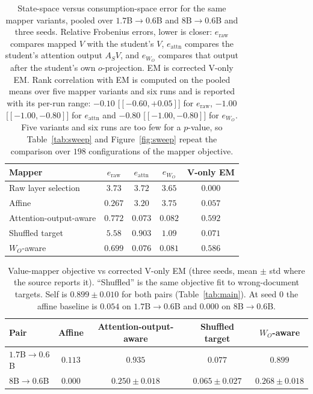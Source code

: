 \documentclass[11pt]{article}
\begin{document}
\begin{table}[t]
\centering
\small
\caption{State-space versus consumption-space error for the same mapper variants,
pooled over $1.7$B$\to0.6$B and $8$B$\to0.6$B and three seeds. Relative
Frobenius errors, lower is closer: $e_{\text{raw}}$ compares mapped $V$ with the
student's $V$, $e_{\text{attn}}$ compares the student's attention output
$A_S V$, and $e_{W_O}$ compares that output after the student's own $o$-projection.
EM is corrected V-only EM. Rank correlation with EM is computed on the pooled
means over five mapper variants and six runs and is reported with its per-run
range: $-0.10$ [$[-0.60,+0.05]$] for $e_{\text{raw}}$, $-1.00$
[$[-1.00,-0.80]$] for $e_{\text{attn}}$ and $-0.80$ [$[-1.00,-0.80]$] for
$e_{W_O}$. Five variants and six runs are too few for a $p$-value, so
Table~\ref{tab:sweep} and Figure~\ref{fig:sweep} repeat the comparison over
$198$ configurations of the mapper objective.}
\label{tab:errorbudget}
\begin{tabular}{lcccc}
\toprule
Mapper & $e_{\text{raw}}$ & $e_{\text{attn}}$ & $e_{W_O}$ & V-only EM \\
\midrule
Raw layer selection    & $3.73$ & $3.72$ & $3.65$ & $0.000$ \\
Affine                 & $\mathbf{0.267}$ & $3.20$ & $3.75$ & $0.057$ \\
Attention-output-aware & $0.772$ & $0.073$ & $0.082$ & $\mathbf{0.592}$ \\
Shuffled target        & $5.58$ & $0.903$ & $1.09$ & $0.071$ \\
$W_O$-aware            & $0.699$ & $\mathbf{0.076}$ & $\mathbf{0.081}$ & $0.586$ \\
\bottomrule
\end{tabular}
\end{table}

\begin{table}[t]
\centering
\small
\caption{Value-mapper objective vs corrected V-only EM (three seeds, mean
$\pm$ std where the source reports it). ``Shuffled'' is the same objective fit to
wrong-document targets. Self is $0.899 \pm 0.010$ for both pairs
(Table~\ref{tab:main}). At seed 0 the affine baseline is $0.054$ on
$1.7$B$\to0.6$B and $0.000$ on $8$B$\to0.6$B.}
\label{tab:mappers}
\begin{tabular}{lcccc}
\toprule
Pair & Affine & Attention-output-aware & Shuffled target & $W_O$-aware \\
\midrule
$1.7$B$\to0.6$B & $0.113$ & $\mathbf{0.935}$ & $0.077$ & $0.899$ \\
$8$B$\to0.6$B   & $0.000$ & $0.250{\pm}0.018$ & $0.065{\pm}0.027$ & $\mathbf{0.268{\pm}0.018}$ \\
\bottomrule
\end{tabular}
\end{table}
\end{document}
